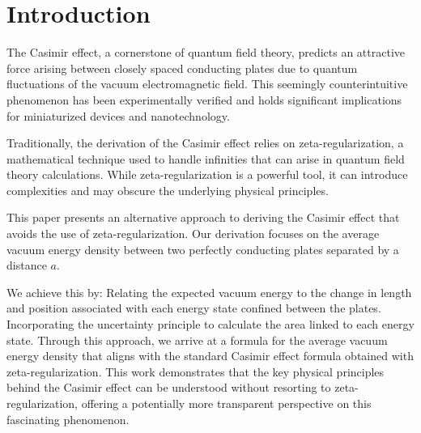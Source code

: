 \section{Introduction}

The Casimir effect, a cornerstone of quantum field theory, predicts an attractive force arising between closely 
spaced conducting plates due to quantum fluctuations of the vacuum electromagnetic field. 
This seemingly counterintuitive phenomenon has been experimentally verified and holds significant 
implications for miniaturized devices and nanotechnology.

Traditionally, the derivation of the Casimir effect relies on zeta-regularization, 
a mathematical technique used to handle infinities that can arise in quantum field theory calculations. 
While zeta-regularization is a powerful tool, it can introduce complexities and may obscure the underlying physical principles.

This paper presents an alternative approach to deriving the Casimir effect that avoids the use of zeta-regularization. 
Our derivation focuses on the average vacuum energy density between two perfectly conducting plates separated by a distance $a$. 

We achieve this by: 
Relating the expected vacuum energy to the change in length and position associated with each energy state confined between the plates. 
Incorporating the uncertainty principle to calculate the area linked to each energy state.
Through this approach, we arrive at a formula for the average vacuum energy density that aligns with the standard Casimir effect formula obtained with zeta-regularization. This work demonstrates that the key physical principles behind the Casimir effect can be understood without resorting to zeta-regularization, offering a potentially more transparent perspective on this fascinating phenomenon.